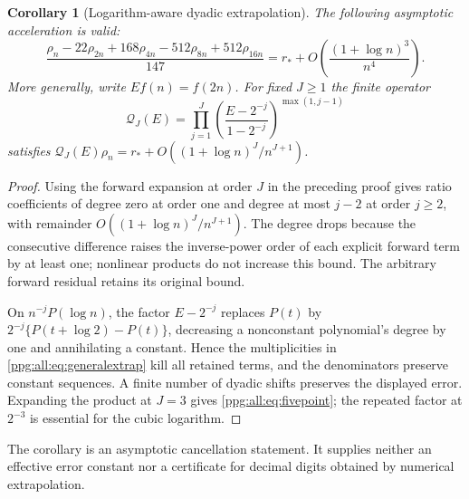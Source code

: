 \documentclass[11pt,letterpaper]{article}
\newtheorem{corollary}[theorem]{Corollary}
\theoremstyle{remark}\newtheorem{remark}[theorem]{Remark}
\numberwithin{equation}{section}
\begin{document}
\begin{corollary}[Logarithm-aware dyadic extrapolation]\label{ppg:all:cor:extrapolation}
The following asymptotic acceleration is valid:
\begin{equation}\label{ppg:all:eq:fivepoint}
 \frac{\rho_n-22\rho_{2n}+168\rho_{4n}-512\rho_{8n}+512\rho_{16n}}{147}
 =r_*+O\!\left(\frac{(1+\log n)^3}{n^4}\right).
\end{equation}
More generally, write $E f(n)=f(2n)$. For fixed $J\ge1$ the finite operator
\begin{equation}\label{ppg:all:eq:generalextrap}
 \mathcal Q_J(E)=\prod_{j=1}^J
     \left(\frac{E-2^{-j}}{1-2^{-j}}\right)^{\max(1,j-1)}
\end{equation}
satisfies
$\mathcal Q_J(E)\rho_n=r_*+O((1+\log n)^J/n^{J+1})$.
\end{corollary}
\begin{proof}
Using the forward expansion at order $J$ in the preceding proof gives ratio coefficients of degree zero at order one and degree at most $j-2$ at order $j\ge2$, with remainder $O((1+\log n)^J/n^{J+1})$. The degree drops because the consecutive difference raises the inverse-power order of each explicit forward term by at least one; nonlinear products do not increase this bound. The arbitrary forward residual retains its original bound.

On $n^{-j}P(\log n)$, the factor $E-2^{-j}$ replaces $P(t)$ by
$2^{-j}\{P(t+\log2)-P(t)\}$, decreasing a nonconstant polynomial's degree by one and annihilating a constant. Hence the multiplicities in \eqref{ppg:all:eq:generalextrap} kill all retained terms, and the denominators preserve constant sequences. A finite number of dyadic shifts preserves the displayed error. Expanding the product at $J=3$ gives \eqref{ppg:all:eq:fivepoint}; the repeated factor at $2^{-3}$ is essential for the cubic logarithm.
\end{proof}
The corollary is an asymptotic cancellation statement. It supplies neither an effective error constant nor a certificate for decimal digits obtained by numerical extrapolation.
\end{document}
